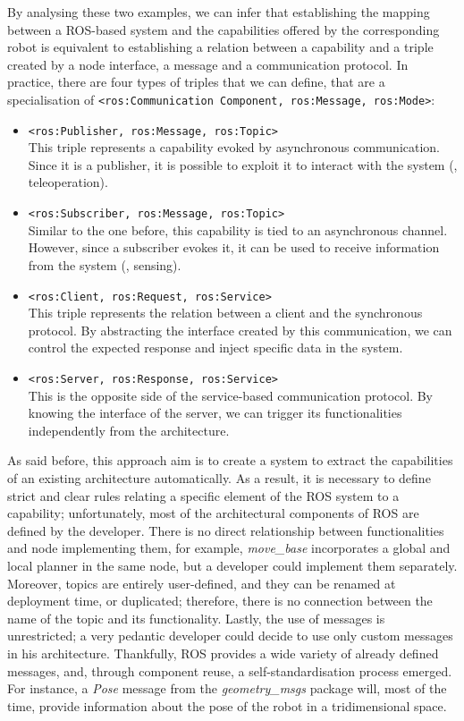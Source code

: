 By analysing these two examples, we can infer that establishing the mapping between a ROS-based system and the capabilities offered by the corresponding robot is equivalent to establishing a relation between a capability and a triple created by a node interface, a message and a communication protocol. In practice, there are four types of triples that we can define, that are a specialisation of \texttt{<ros:Communication Component, ros:Message, ros:Mode>}:
\begin{itemize}
\item \texttt{<ros:Publisher, ros:Message, ros:Topic>} \\ This triple represents a capability evoked by asynchronous communication. Since it is a publisher, it is possible to exploit it to interact with the system (\eg, teleoperation).
\item \texttt{<ros:Subscriber, ros:Message, ros:Topic>} \\ Similar to the one before, this capability is tied to an asynchronous channel. However, since a subscriber evokes it, it can be used to receive information from the system (\eg, sensing).
\item \texttt{<ros:Client, ros:Request, ros:Service>} \\ This triple represents the relation between a client and the synchronous protocol. By abstracting the interface created by this communication, we can control the expected response and inject specific data in the system.
\item \texttt{<ros:Server, ros:Response, ros:Service>} \\ This is the opposite side of the service-based communication protocol. By knowing the interface of the server, we can trigger its functionalities independently from the architecture.
\end{itemize}

As said before, this approach aim is to create a system to extract the capabilities of an existing architecture automatically. As a result, it is necessary to define strict and clear rules relating a specific element of the ROS system to a capability; unfortunately, most of the architectural components of ROS are defined by the developer. There is no direct relationship between functionalities and node implementing them, for example, \textit{move\_base} incorporates a global and local planner in the same node, but a developer could implement them separately. Moreover, topics are entirely user-defined, and they can be renamed at deployment time, or duplicated; therefore, there is no connection between the name of the topic and its functionality. Lastly, the use of messages is unrestricted; a very pedantic developer could decide to use only custom messages in his architecture. Thankfully, ROS provides a wide variety of already defined messages, and, through component reuse, a self-standardisation process emerged. For instance, a \textit{Pose} message from the \textit{geometry\_msgs} package will, most of the time, provide information about the pose of the robot in a tridimensional space.

